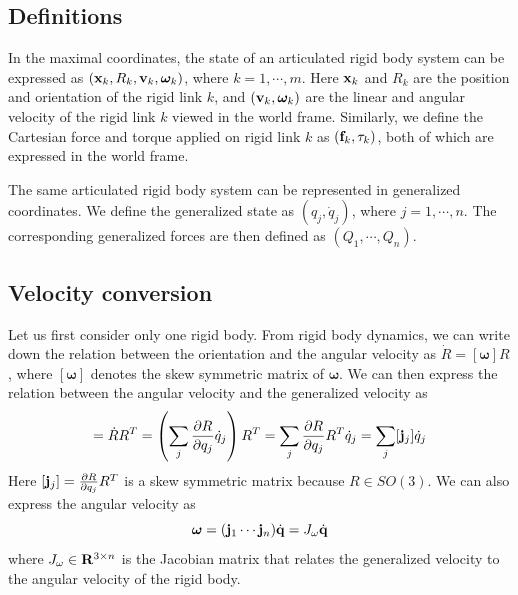 \subsection{Definitions}
In the maximal coordinates, the state of an articulated rigid body
system can be expressed as $(\mathbf{x}_k, R_k, \mathbf{v}_k,
\boldsymbol{\bm{\omega}}_k)$, where $k = 1, \cdots, m$. Here $\mathbf{x}_k$ and
$R_k$ are the position and orientation of the rigid link $k$, and $(\mathbf{v}_k,
\boldsymbol{\bm{\omega}}_k)$ are the linear and angular velocity of the
rigid link $k$ viewed in the world frame. Similarly, we define the
Cartesian force and torque applied on rigid link $k$ as $(\mathbf{f}_k,
{\tau}_k)$, both of which are expressed in the world
frame.

The same articulated rigid body system can be represented in
generalized coordinates. We define the generalized state as $(q_j,
\dot{q}_j)$, where $j = 1, \cdots, n$. The corresponding generalized
forces are then defined as $(Q_1, \cdots, Q_n)$.

\subsection{Velocity conversion}
Let us first consider only one rigid body. From rigid body dynamics,
we can write down the relation between the orientation and the angular
velocity as $\dot{R} = [\bm{\omega}] R$, where $[\boldsymbol{\bm{\omega}}]$
denotes the skew symmetric matrix of ${\bm{\omega}}$. We can
then express the relation between the angular velocity and the
generalized velocity as
\begin{equation}
[\bm{\omega}] = \dot{R} R^{T} = \left(\sum_j \frac{\partial R}{\partial q_j}
\dot{q}_j \right) R^T = \sum_j\frac{\partial R}{\partial q_j} R^T
\dot{q}_j = \sum_j [\vc{j}_j] \dot{q}_j
\end{equation}
Here $[\mathbf{j}_j] = \frac{\partial R}{\partial q_j} R^T$ is a skew
symmetric matrix because $R \in SO(3)$. We can also express the
angular velocity as
\begin{equation}
\bm{\omega} = ( \mathbf{j}_1 \cdots \mathbf{j}_n) \dot{\mathbf{q}} = J_{\omega} \dot{\mathbf{q}}
\end{equation}
where $ J_{\omega} \in \mathbf{R}^{3 \times n}$ is the Jacobian matrix
that relates the generalized velocity to the angular velocity of the
rigid body.
 


